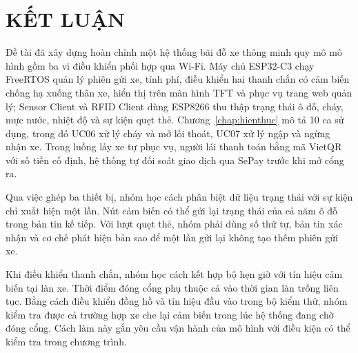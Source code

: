 \chapter*{KẾT LUẬN}\label{chap:ketluan}
Đề tài đã xây dựng hoàn chỉnh một hệ thống bãi đỗ xe thông minh quy mô mô hình gồm ba vi điều
khiển phối hợp qua Wi-Fi. Máy chủ ESP32-C3 chạy FreeRTOS quản lý phiên gửi xe, tính phí, điều
khiển hai thanh chắn có cảm biến chống hạ xuống thân xe, hiển thị trên màn hình TFT và phục vụ
trang web quản lý; Sensor Client và RFID Client dùng ESP8266 thu thập trạng thái ô đỗ, cháy, mực nước, nhiệt độ và sự
kiện quẹt thẻ. Chương~\ref{chap:hienthuc} mô tả 10 ca sử dụng, trong đó UC06 xử lý cháy và mở lối thoát, UC07 xử lý ngập và ngừng nhận xe. Trong luồng lấy xe tự phục vụ, người lái thanh toán bằng mã
VietQR với số tiền cố định, hệ thống tự đối soát giao dịch qua SePay trước khi mở cổng ra.

Qua việc ghép ba thiết bị, nhóm học cách phân biệt dữ liệu trạng thái với sự kiện chỉ xuất hiện một lần. Nút cảm biến có thể gửi lại trạng thái của cả năm ô đỗ trong bản tin kế tiếp. Với lượt quẹt thẻ, nhóm phải dùng số thứ tự, bản tin xác nhận và cơ chế phát hiện bản sao để một lần gửi lại không tạo thêm phiên gửi xe.

Khi điều khiển thanh chắn, nhóm học cách kết hợp bộ hẹn giờ với tín hiệu cảm biến tại làn xe. Thời điểm đóng cổng phụ thuộc cả vào thời gian làn trống liên tục. Bằng cách điều khiển đồng hồ và tín hiệu đầu vào trong bộ kiểm thử, nhóm kiểm tra được cả trường hợp xe che lại cảm biến trong lúc hệ thống đang chờ đóng cổng. Cách làm này gắn yêu cầu vận hành của mô hình với điều kiện có thể kiểm tra trong chương trình.
